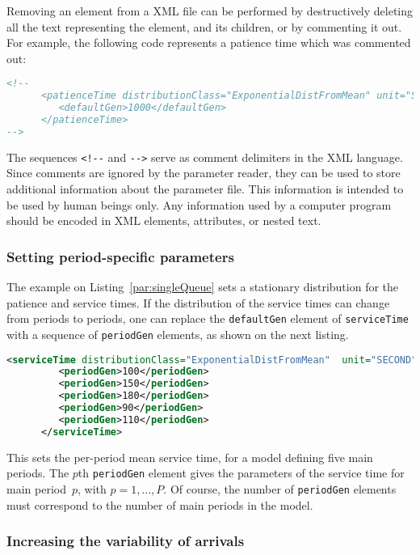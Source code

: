 Removing an element from a XML file can be performed by destructively
deleting all the text representing the element, and its children, or
by commenting it out. For example, the following code represents a
patience time which was commented out:
\begin{lstlisting}[language=XML]
<!--
      <patienceTime distributionClass="ExponentialDistFromMean" unit="SECOND">
         <defaultGen>1000</defaultGen>
      </patienceTime>
-->
\end{lstlisting}
The sequences \verb.<!--. and \verb.-->. serve as comment delimiters
in the XML language.  Since comments are ignored by the parameter
reader, they can be used to store additional information about the
parameter file.  This information is intended to be used by human
beings only.
Any information used by a computer program should be encoded in
XML elements, attributes, or nested text.

\subsubsection{Setting period-specific parameters}

The example on Listing~\ref{par:singleQueue} sets a stationary
distribution for the patience and service times.  If the distribution
of the service times can change from periods to periods, one can
replace the \texttt{default\-Gen} element of \texttt{service\-Time}
with a sequence of \texttt{period\-Gen} elements, as shown on the next
listing.
\begin{lstlisting}[language=XML]
      <serviceTime distributionClass="ExponentialDistFromMean"  unit="SECOND">
         <periodGen>100</periodGen>
         <periodGen>150</periodGen>
         <periodGen>180</periodGen>
         <periodGen>90</periodGen>
         <periodGen>110</periodGen>
      </serviceTime>
\end{lstlisting}
This sets the per-period mean service time, for a model defining five
main periods.
The $p$th \texttt{period\-Gen} element gives the parameters of the
service time for main period~$p$, with $p=1,\ldots,P$.
Of course, the number of \texttt{period\-Gen} elements must correspond
to the number of main periods in the model.

\subsubsection{Increasing the variability of arrivals}

